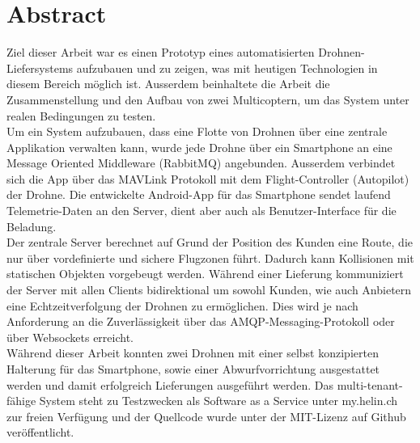 \newpage
{}
\chapter*{Abstract}
Ziel dieser Arbeit war es einen Prototyp eines automatisierten Drohnen-Liefersystems aufzubauen und zu zeigen, was mit heutigen Technologien in diesem Bereich möglich ist. Ausserdem beinhaltete die Arbeit die Zusammenstellung und den Aufbau von zwei Multicoptern, um das System unter realen Bedingungen zu testen.\\

Um ein System aufzubauen, dass eine Flotte von Drohnen über eine zentrale Applikation verwalten kann, wurde jede Drohne über ein Smartphone an eine Message Oriented Middleware (RabbitMQ) angebunden. Ausserdem verbindet sich die App über das \Gls{MAVLink} Protokoll mit dem \Gls{Flight-Controller} (Autopilot) der Drohne. Die entwickelte Android-App für das Smartphone sendet laufend Telemetrie-Daten an den Server, dient aber auch als Benutzer-Interface für die Beladung. \\

Der zentrale Server berechnet auf Grund der Position des Kunden eine Route, die nur über vordefinierte und sichere Flugzonen führt. Dadurch kann Kollisionen mit statischen Objekten vorgebeugt werden. Während einer Lieferung kommuniziert der Server mit allen Clients bidirektional um sowohl Kunden, wie auch Anbietern eine Echtzeitverfolgung der Drohnen zu ermöglichen. Dies wird je nach Anforderung an die Zuverlässigkeit über das AMQP-Messaging-Protokoll oder über Websockets erreicht.  \\

Während dieser Arbeit konnten zwei Drohnen mit einer selbst konzipierten Halterung für das Smartphone, sowie einer Abwurfvorrichtung ausgestattet werden und damit erfolgreich Lieferungen ausgeführt werden. Das multi-tenant-fähige System steht zu Testzwecken als Software as a Service unter my.helin.ch zur freien Verfügung und der Quellcode wurde unter der MIT-Lizenz auf Github veröffentlicht.



